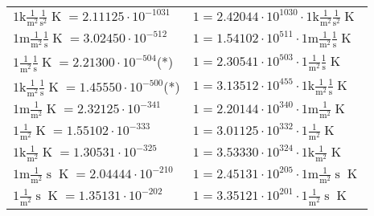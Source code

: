 \begin{center}
\begin{longtable}{l l}
{\color{gray}$1 \bm{\mathrm{ k}}\frac1{\operatorname{m}^2}\frac1{\operatorname{s}^2}{}{\operatorname{K}} = 2.11125\cdot10^{-1031} $}   & {\color{gray}$ 1 = 2.42044\cdot10^{1030} \cdot 1 \bm{\mathrm{ k}}\frac1{\operatorname{m}^2}\frac1{\operatorname{s}^2}{}{\operatorname{K}}$}  \\
{\color{gray}$1 \bm{\mathrm{ m}}\frac1{\operatorname{m}^2}\frac1{\operatorname{s}}{}{\operatorname{K}} = 3.02450\cdot10^{-512} $}   & {\color{gray}$ 1 = 1.54102\cdot10^{511} \cdot 1 \bm{\mathrm{ m}}\frac1{\operatorname{m}^2}\frac1{\operatorname{s}}{}{\operatorname{K}}$}  \\
{\color{black}$1 \bm{\mathrm{ }}\frac1{\operatorname{m}^2}\frac1{\operatorname{s}}{}{\operatorname{K}} = 2.21300\cdot10^{-504} $}\quad(*) & {\color{black}$ 1 = 2.30541\cdot10^{503} \cdot 1 \bm{\mathrm{ }}\frac1{\operatorname{m}^2}\frac1{\operatorname{s}}{}{\operatorname{K}}$}  \\
{\color{gray}$1 \bm{\mathrm{ k}}\frac1{\operatorname{m}^2}\frac1{\operatorname{s}}{}{\operatorname{K}} = 1.45550\cdot10^{-500} $}\quad(*) & {\color{gray}$ 1 = 3.13512\cdot10^{455} \cdot 1 \bm{\mathrm{ k}}\frac1{\operatorname{m}^2}\frac1{\operatorname{s}}{}{\operatorname{K}}$}  \\
{\color{gray}$1 \bm{\mathrm{ m}}\frac1{\operatorname{m}^2}{}{}{\operatorname{K}} = 2.32125\cdot10^{-341} $}   & {\color{gray}$ 1 = 2.20144\cdot10^{340} \cdot 1 \bm{\mathrm{ m}}\frac1{\operatorname{m}^2}{}{}{\operatorname{K}}$}  \\
{\color{black}$1 \bm{\mathrm{ }}\frac1{\operatorname{m}^2}{}{}{\operatorname{K}} = 1.55102\cdot10^{-333} $}   & {\color{black}$ 1 = 3.01125\cdot10^{332} \cdot 1 \bm{\mathrm{ }}\frac1{\operatorname{m}^2}{}{}{\operatorname{K}}$}  \\
{\color{gray}$1 \bm{\mathrm{ k}}\frac1{\operatorname{m}^2}{}{}{\operatorname{K}} = 1.30531\cdot10^{-325} $}   & {\color{gray}$ 1 = 3.53330\cdot10^{324} \cdot 1 \bm{\mathrm{ k}}\frac1{\operatorname{m}^2}{}{}{\operatorname{K}}$}  \\
{\color{gray}$1 \bm{\mathrm{ m}}\frac1{\operatorname{m}^2}{\operatorname{s}}{}{\operatorname{K}} = 2.04444\cdot10^{-210} $}   & {\color{gray}$ 1 = 2.45131\cdot10^{205} \cdot 1 \bm{\mathrm{ m}}\frac1{\operatorname{m}^2}{\operatorname{s}}{}{\operatorname{K}}$}  \\
{\color{black}$1 \bm{\mathrm{ }}\frac1{\operatorname{m}^2}{\operatorname{s}}{}{\operatorname{K}} = 1.35131\cdot10^{-202} $}   & {\color{black}$ 1 = 3.35121\cdot10^{201} \cdot 1 \bm{\mathrm{ }}\frac1{\operatorname{m}^2}{\operatorname{s}}{}{\operatorname{K}}$}  \\

\end{longtable}
\end{center}
